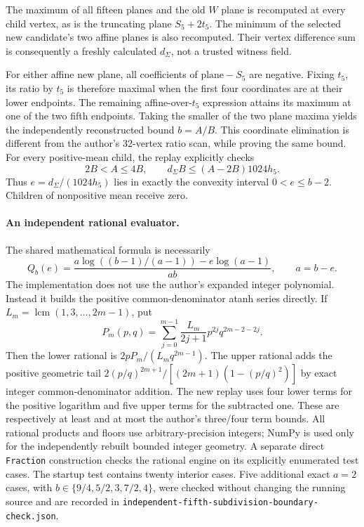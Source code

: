 The maximum of all fifteen planes and the old $W$ plane is recomputed
at every child vertex, as is the truncating plane $S_5+2t_5$. The
minimum of the selected new candidate's two affine planes is also
recomputed. Their vertex difference sum is consequently a freshly
calculated $d_\Sigma$, not a trusted witness field.

For either affine new plane, all coefficients of
$\text{plane}-S_5$ are negative. Fixing $t_5$, its ratio by $t_5$
is therefore maximal when the first four coordinates are at their
lower endpoints. The remaining affine-over-$t_5$ expression attains
its maximum at one of the two fifth endpoints. Taking the smaller of
the two plane maxima yields the independently reconstructed bound
$b=A/B$. This coordinate elimination is different from the author's
$32$-vertex ratio scan, while proving the same bound. For every
positive-mean child, the replay explicitly checks
\[
 2B<A\le4B,\qquad
 d_\Sigma B\le(A-2B)1024h_5.
\]
Thus $e=d_\Sigma/(1024h_5)$ lies in exactly the convexity interval
$0<e\le b-2$. Children of nonpositive mean receive zero.

\paragraph{An independent rational evaluator.}
The shared mathematical formula is necessarily
\[
 Q_b(e)=\frac{a\log((b-1)/(a-1))-e\log(a-1)}{ab},
 \qquad a=b-e.
\]
The implementation does not use the author's expanded integer
polynomial. Instead it builds the positive common-denominator atanh
series directly. If $L_m=\operatorname{lcm}(1,3,\ldots,2m-1)$, put
\[
 P_m(p,q)=\sum_{j=0}^{m-1}\frac{L_m}{2j+1}
                  p^{2j}q^{2m-2-2j}.
\]
Then the lower rational is
$2pP_m/(L_mq^{2m-1})$. The upper rational adds the positive geometric
tail $2(p/q)^{2m+1}/[(2m+1)(1-(p/q)^2)]$ by exact integer
common-denominator addition. The new replay uses four lower terms for
the positive logarithm and five upper terms for the subtracted one.
These are respectively at least and at most the author's three/four
term bounds. All rational products and floors use arbitrary-precision
integers; NumPy is used only for the independently rebuilt bounded
integer geometry. A separate direct \texttt{Fraction} construction
checks the rational engine on its explicitly enumerated test cases.
The startup test contains twenty interior cases. Five additional exact
$a=2$ cases, with $b\in\{9/4,5/2,3,7/2,4\}$, were checked without
changing the running source and are recorded in
\texttt{independent-fifth-subdivision-boundary-check.json}.

